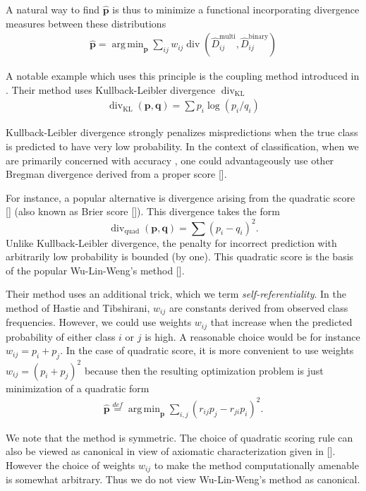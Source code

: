 \documentclass[twoside,11pt]{article}
\DeclareMathOperator*{\divm}{div}
\DeclareMathOperator*{\argmin}{arg\,min}
\begin{document}
A natural way to find  $\hat{\boldsymbol{p}}$ is thus to minimize a functional incorporating divergence measures between these distributions
\begin{align*}
\hat{\boldsymbol{p}} = \argmin_{\boldsymbol{p}} \sum_{ij} w_{ij} \divm (\hat D_{ij}^\textrm{multi}, \hat D_{ij}^\textrm{binary})
\end{align*}

A notable example which uses this principle is the coupling method introduced in \cite{hastie1998classification}. Their method uses Kullback-Leibler divergence $\divm_\textrm{KL}$
\begin{align*}
	\divm\nolimits_\textrm{KL} (\boldsymbol{p}, \boldsymbol{q})= \sum p_i \log (p_i/ q_i)
\end{align*}

Kullback-Leibler divergence strongly penalizes  mispredictions when the true class is predicted to have very low probability. In the context of classification, when we are primarily concerned with accuracy , one could advantageously use other Bregman divergence derived from a proper score [\cite{gneiting2007strictly, buja2005loss}].
 
For instance, a popular alternative is divergence arising from the quadratic  score [\cite{gneiting2007strictly}] (also known as Brier score [\cite{brier1950verification}]). This divergence takes the form
$$
\divm\nolimits_\textrm{quad} (\boldsymbol{p}, \boldsymbol{q})= \sum (p_i - q_i)^2.
$$
Unlike Kullback-Leibler divergence, the penalty for incorrect prediction with arbitrarily low probability is bounded (by one). This quadratic score is the basis of the popular Wu-Lin-Weng's method [\cite{wu2004probability}]. 

Their method uses an additional trick, which we term \emph{self-referentiality}. In the method of Hastie and Tibshirani, $w_{ij}$ are constants derived from observed class frequencies. However, we could use weights $w_{ij}$ that increase when the predicted probability of either class $i$ or $j$ is high. A reasonable choice would be for instance $w_{ij}= p_i + p_j$. In the case of quadratic score, it is more convenient to use weights $w_{ij} = (p_i + p_j)^2$ because then the resulting optimization problem is just minimization of a quadratic form
\begin{align*}
\hat{\boldsymbol{p}} \stackrel{def}{=} \argmin_{\boldsymbol{p}} \sum_{i,j} (r_{ij}p_j - r_{ji}p_i)^2.
\end{align*}

We note that the method is symmetric. The choice of quadratic scoring rule can also be viewed as canonical in view of axiomatic characterization given in  [\cite{selten1998axiomatic}].  However the choice of weights $w_{ij}$ to make the method computationally amenable is somewhat arbitrary. Thus we do not view Wu-Lin-Weng's method as canonical.
\end{document}
